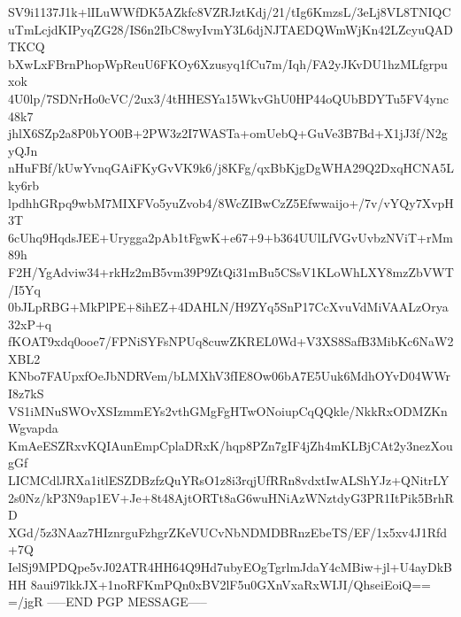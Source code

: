 SV9i1137J1k+lILuWWfDK5AZkfc8VZRJztKdj/21/tIg6KmzsL/3eLj8VL8TNIQC
uTmLcjdKIPyqZG28/IS6n2IbC8wyIvmY3L6djNJTAEDQWmWjKn42LZcyuQADTKCQ
bXwLxFBrnPhopWpReuU6FKOy6Xzusyq1fCu7m/Iqh/FA2yJKvDU1hzMLfgrpuxok
4U0lp/7SDNrHo0cVC/2ux3/4tHHESYa15WkvGhU0HP44oQUbBDYTu5FV4ync48k7
jhlX6SZp2a8P0bYO0B+2PW3z2I7WASTa+omUebQ+GuVe3B7Bd+X1jJ3f/N2gyQJn
nHuFBf/kUwYvnqGAiFKyGvVK9k6/j8KFg/qxBbKjgDgWHA29Q2DxqHCNA5Lky6rb
lpdhhGRpq9wbM7MIXFVo5yuZvob4/8WcZIBwCzZ5Efwwaijo+/7v/vYQy7XvpH3T
6cUhq9HqdsJEE+Urygga2pAb1tFgwK+e67+9+b364UUlLfVGvUvbzNViT+rMm89h
F2H/YgAdviw34+rkHz2mB5vm39P9ZtQi31mBu5CSsV1KLoWhLXY8mzZbVWT/I5Yq
0bJLpRBG+MkPlPE+8ihEZ+4DAHLN/H9ZYq5SnP17CcXvuVdMiVAALzOrya32xP+q
fKOAT9xdq0ooe7/FPNiSYFsNPUq8cuwZKREL0Wd+V3XS8SafB3MibKc6NaW2XBL2
KNbo7FAUpxfOeJbNDRVem/bLMXhV3fIE8Ow06bA7E5Uuk6MdhOYvD04WWrI8z7kS
VS1iMNuSWOvXSIzmmEYs2vthGMgFgHTwONoiupCqQQkle/NkkRxODMZKnWgvapda
KmAeESZRxvKQIAunEmpCplaDRxK/hqp8PZn7gIF4jZh4mKLBjCAt2y3nezXougGf
LICMCdlJRXa1itlESZDBzfzQuYRsO1z8i3rqjUfRRn8vdxtIwALShYJz+QNitrLY
2s0Nz/kP3N9ap1EV+Je+8t48AjtORTt8aG6wuHNiAzWNztdyG3PR1ItPik5BrhRD
XGd/5z3NAaz7HIznrguFzhgrZKeVUCvNbNDMDBRnzEbeTS/EF/1x5xv4J1Rfd+7Q
IelSj9MPDQpe5vJ02ATR4HH64Q9Hd7ubyEOgTgrlmJdaY4cMBiw+jl+U4ayDkBHH
8aui97lkkJX+1noRFKmPQn0xBV2lF5u0GXnVxaRxWIJI/QhseiEoiQ==
=/jgR
-----END PGP MESSAGE-----
